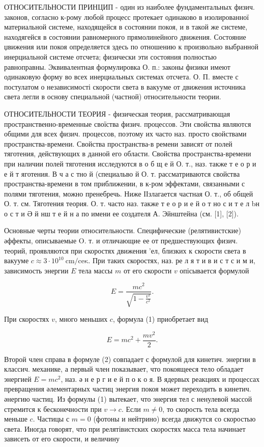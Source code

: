 \documentclass[10pt]{article}
\begin{document}
ОТНОСИТЕЛЬНОСТИ ПРИНЦИП - один из наиболее фундаментальных физич. законов, согласно к-рому любой процесс протекает одинаково в изолированної материальной системе, находящейся в состоянии покоя, и в такой же системе, находягейся в состоянии равномерного прямолинейного движения. Состояние џвижения или покоя определяется здесь по отношению к произвольно выбранной инерциальной системе отсчета; физически эти состояния полностью равноправны. Эквивалентная формулировка О. п.: законы физики имеют одинаковую форму во всех инерциальных системах отсчета. О. П. вместе с постулатом о независимості скорости света в вакууме от движения источника света легли в основу специальной (частной) относительности теории.

ОТНОСИТЕЛЬНОСТИ ТЕОРИЯ - физическая теория, рассматривающая пространственно-временные своїства физич. процессов. Эти свойства являются общими для всех физич. процессов, поэтому их часто наз. просто свойствами пространства-времени. Свойства пространства-в ремени зависят от полей тяготения, действующих в данной его области. Свойства пространства-времени при наличии полей тяготения исследуются в о б щ е й О. т., наз. также т е о р и е й т яготения. В ч а с тно й (специальво й О. т. рассматриваются свойства пространства-времени в том приближении, в к-ром эффектами, связанными с полями тяготения, можно пренебречь. Ниже ІІзлагается частная О. т., об общей О. т. см. Тяготения теория. О. т. часто наз. также т е о р и е й о т но с и т е л bн о с т и Ә й нш т е й н а по имени ее создателя А. Эйнштейна (см. [1], [2]).

Основные черты теории относительности. Специфические (релятивистские) әффекты, описываемые O. т. и отличающие ее от предшествующих физич. теорий, проявляются при скоростях движения 'ел, близких к скорости света в вакууме $c \approx 3 \cdot 10^{10} \mathrm{~cm} / \mathrm{ce \kappa}$. При таких скоростях, наз. ре л я т и в и с т с и м и, зависимость энергии $E$ тела массы $m$ от его скорости $v$ опісывается формулой

\[
E=\frac{m c^{2}}{\sqrt{1-\frac{v^{2}}{c^{2}}}} .
\]

При скоростях $v$, много меньших $c$, формула (1) приобретает вид

\[
E=m c^{2}+\frac{m v^{2}}{2} .
\]

Второй член справа в формуле (2) совпадает с формулой для кинетич. энергии в классич. механике, а первый член показывает, что покоящееся тело обладает энергией $E=m c^{2}$, наз. ә н е р г и е й п о к о я. В ядервых реакциях и процессах превращения әлементарных частиц энергия покоя может переходить в кинетич. әнергию частиц. Из формулы (1) вытекает, что энергия тел с ненулевой массой стремится к бесконечности при $v \rightarrow c$. Если $m \neq 0$, то скорость тела всегда меньше $c$. Частицы с $m=0$ (фотоны и нейтрино) всегда движутся со скоростью света. Иногда говорят, что при релятівистских скоростях масса тела начинает зависеть от его скорости, и величину
\end{document}
